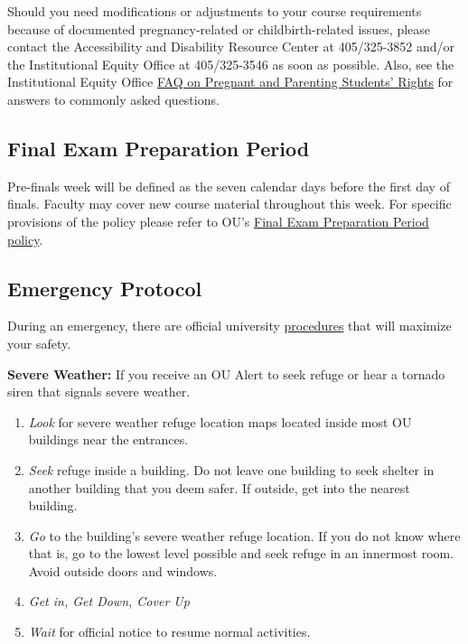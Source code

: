 \documentclass[11pt,english]{article}
\begin{document}
Should you need modifications or adjustments to your course requirements because of documented pregnancy-related or childbirth-related issues, please contact the Accessibility and Disability Resource Center at 405/325-3852 and/or the Institutional Equity Office at 405/325-3546 as soon as possible. Also, see the Institutional Equity Office \href{https://www.ou.edu/content/dam/eoo/documents/faqs/faqs-pregnant-and-parenting-students.pdf}{FAQ on Pregnant and Parenting Students' Rights} for answers to commonly asked questions.

\subsection*{Final Exam Preparation Period}

Pre-finals week will be defined as the seven calendar days before the first day of finals. Faculty may cover new course material throughout this week. For specific provisions of the policy please refer to OU's \href{https://www.ou.edu/registrar/academic-records/academic-calendars/final-exam-schedule/final-exam-policies}{Final Exam Preparation Period policy}.

\subsection*{Emergency Protocol}

During an emergency, there are official university \href{https://www.ou.edu/campussafety/policy-and-procedures}{procedures} that will maximize your safety.

\textbf{Severe Weather:} If you receive an OU Alert to seek refuge or hear a tornado siren that signals severe weather.

\begin{enumerate}
    \item \textit{Look} for severe weather refuge location maps located inside most OU buildings near the entrances.
    \item \textit{Seek} refuge inside a building. Do not leave one building to seek shelter in another building that you deem safer. If outside, get into the nearest building.
    \item \textit{Go} to the building's severe weather refuge location. If you do not know where that is, go to the lowest level possible and seek refuge in an innermost room. Avoid outside doors and windows.
    \item \textit{Get in, Get Down, Cover Up}
    \item \textit{Wait} for official notice to resume normal activities.
\end{enumerate}
\end{document}
